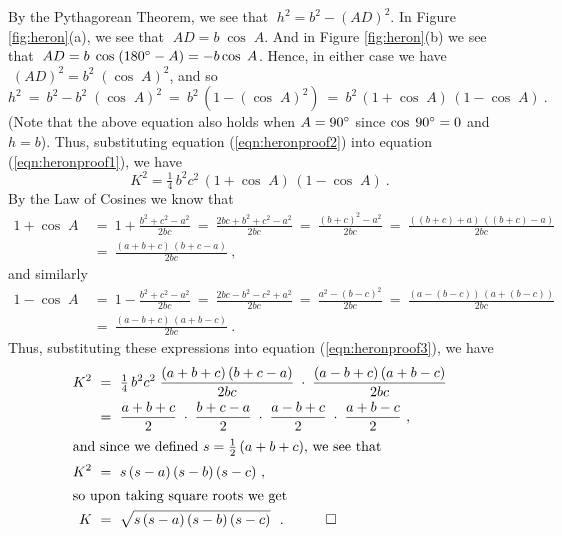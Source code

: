 \noindent By the Pythagorean Theorem, we see that $\;h^2 = b^2 - (AD)^2$. In Figure
\ref{fig:heron}(a), we see that $\;AD = b\;\cos\;A$. And in Figure \ref{fig:heron}(b) we see that
$\;AD = b\;\cos\;(180^\circ - A) = -b\cos\;A$. Hence, in either case we have
$\;(AD)^2 = b^2 \;(\cos\;A)^2$, and so
\begin{equation}\label{eqn:heronproof2}
 h^2 ~=~ b^2 - b^2 \;(\cos\;A)^2 ~=~ b^2 \,(1 - (\cos\;A)^2 ) ~=~ b^2 \,(1+ \cos\;A)\,(1- \cos\;A)~.
\end{equation}
(Note that the above equation also holds when $A=90^\circ$ since $\cos\;90^\circ =0$ and $h=b$).
Thus, substituting equation (\ref{eqn:heronproof2}) into equation (\ref{eqn:heronproof1}), we have
\begin{equation}\label{eqn:heronproof3}
 K^2 = \tfrac{1}{4}\,b^2 c^2 \,(1+ \cos\;A)\,(1- \cos\;A) ~.
\end{equation}
By the Law of Cosines we know that
\begin{align*}
 1 + \cos\;A ~&=~ 1 + \frac{b^2 + c^2 - a^2}{2bc} ~=~ \frac{2bc + b^2 + c^2 - a^2}{2bc}
  ~=~ \frac{(b+c)^2 - a^2}{2bc} ~=~ \frac{((b+c) + a)\,((b+c) - a)}{2bc}\\
  &=~ \frac{(a + b + c)\,(b + c - a)}{2bc} ~,
\end{align*}
and similarly
\begin{align*}
 1 - \cos\;A ~&=~ 1 - \frac{b^2 + c^2 - a^2}{2bc} ~=~ \frac{2bc - b^2 - c^2 + a^2}{2bc}
  ~=~ \frac{a^2 - (b-c)^2}{2bc} ~=~ \frac{(a - (b-c))\,(a + (b-c))}{2bc}\\
  &=~ \frac{(a - b + c)\,(a + b - c)}{2bc} ~.
\end{align*}
Thus, substituting these expressions into equation (\ref{eqn:heronproof3}), we have
\begin{align*}
 K^2 ~&=~ \tfrac{1}{4}\,b^2 c^2 \;\frac{(a + b + c)\,(b + c - a)}{2bc} \;\cdot\;
  \frac{(a - b + c)\,(a + b - c)}{2bc}\\
  &=~ \frac{a + b + c}{2} \;\cdot\; \frac{b + c - a}{2} \;\cdot\; \frac{a - b + c}{2} \;\cdot\;
   \frac{a + b - c}{2} ~,\\
 \intertext{and since we defined $s = \frac{1}{2}\,(a+b+c)$, we see that}
  K^2 ~&=~ s\,(s-a)\,(s-b)\,(s-c) ~,\\
 \intertext{so upon taking square roots we get}
 K ~&=~ \sqrt{s\,(s-a)\,(s-b)\,(s-c)} ~~.\quad\qed
\end{align*}
\newpage
